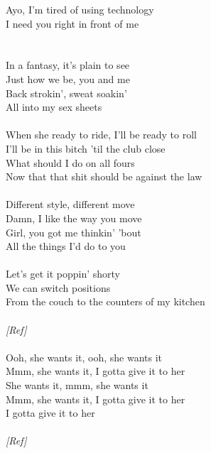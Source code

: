 {Ayo, I'm tired of using technology\\
I need you right in front of me\\
\\
\\
In a fantasy, it's plain to see\\
Just how we be, you and me\\
Back strokin', sweat soakin'\\
All into my sex sheets\\
\\
When she ready to ride, I'll be ready to roll\\
I'll be in this bitch 'til the club close\\
What should I do on all fours\\
Now that that shit should be against the law\\
\\
Different style, different move\\
Damn, I like the way you move\\
Girl, you got me thinkin' 'bout\\
All the things I'd do to you\\
\\
Let's get it poppin' shorty\\
We can switch positions\\
From the couch to the counters of my kitchen\\
\\
\emph{[Ref]}\\
\\
Ooh, she wants it, ooh, she wants it\\
Mmm, she wants it, I gotta give it to her\\
She wants it, mmm, she wants it\\
Mmm, she wants it, I gotta give it to her\\
I gotta give it to her\\
\\
\emph{[Ref]}
}


